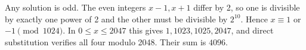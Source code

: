 Any solution is odd. The even integers $x-1,x+1$ differ by 2, so one is divisible by exactly one power of 2 and the other must be divisible by $2^{10}$. Hence $x\equiv1$ or $-1\pmod{1024}$. In $0\le x\le2047$ this gives $1,1023,1025,2047$, and direct substitution verifies all four modulo 2048. Their sum is $\boxed{4096}$.
